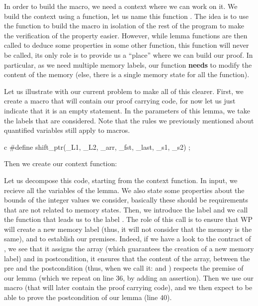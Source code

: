 In order to build the macro, we need a context where we can work on it. We build
the context using a function, let us name this function
. The idea is to use the function to
build the macro in isolation of the rest of the program to make the verification
of the property easier. However, while lemma functions are then called to deduce
some properties in some other function, this function will never be called, its
only role is to provide us a ``place'' where we can build our proof. In
particular, as we need multiple memory labels, our function \textbf{needs} to
modify the content of the memory (else, there is a single memory state for all
the function).



Let us illustrate with our current problem to make all of this clearer. First,
we create a macro  that will contain our proof carrying
code, for now let us just indicate that it is an empty statement. In the
parameters of this lemma, we take the labels that are considered. Note that the
rules we previously mentioned about quantified variables still apply to macros.


\begin{CodeBlock}{c}
#define shift_ptr(_L1, _L2, _arr, _fst, _last, _s1, _s2) ;
\end{CodeBlock}


Then we create our context function:




Let us decompose this code, starting from the context function. In input, we
recieve all the variables of the lemma. We also state some properties about the
bounds of the integer values we consider, basically these should be requirements
that are not related to memory states. Then, we introduce the label
 and we call the function  that leads
us to the label . The role of this call is to ensure that WP will
create a new memory label (thus, it will not consider that the memory is the
same), and to establish our premises. Indeed, if we have a look to the contract
of , we see that it assigns the array (which
guarantees the creation of a new memory label) and in postcondition, it ensures
that the content of the array, between the pre and the postcondition (thus, when
we call it:  and ) respects the premise of our
lemma (which we repeat on line 36, by adding an assertion). Then we use our
 macro (that will later contain the proof carrying code),
and we then expect to be able to prove the postcondition of our lemma (line 40).



